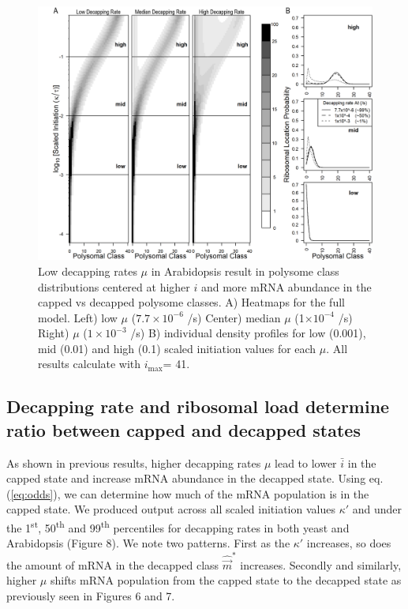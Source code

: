 \documentclass[a4,center,fleqn,nocrop]{NAR}
\newcommand{\imax}{\ensuremath{{i_{\max}}}\xspace}
\newcommand{\mvec}{\ensuremath{\vec{m}}\xspace}
\newcommand{\mvechat}{\ensuremath{\hat{\mvec}}\xspace}
\newcommand{\mvechatstar}{\ensuremath{\mvechat^*}\xspace}
\newcommand{\MRL}{\ensuremath{\bar{i}}\xspace}
\begin{document}
\begin{figure}[!ht]
\begin{center}
\centering
\includegraphics[width=140mm]{Images/2023-07-09_Figure2_At_Marking_Rate_range_medianlength_with_labels.png}
\caption{Low decapping rates $\mu$ in Arabidopsis result in polysome class distributions centered at higher $i$ and more mRNA abundance in the capped vs decapped polysome classes.  A)  Heatmaps for the full model. Left) low $\mu$ ($7.7\times 10^{-6}$ /s) Center) median $\mu$ (1$\times 10^{-4}$ /s) Right) $\mu$ ($1\times 10^{-3}$ /s) B) individual density profiles for low (0.001), mid (0.01) and high (0.1) scaled initiation values for each $\mu$. All results calculate with \imax = 41.}
\end{center}
\end{figure}



\subsection{Decapping rate and ribosomal load determine ratio between capped and decapped states}
 As shown in previous results, higher decapping rates $\mu$ lead to lower \MRL in the capped state and increase mRNA abundance in the decapped state.
Using eq. (\ref{eq:odds}), we can determine how much of the mRNA population is in the capped state.
We produced output across all scaled initiation values $\kappa'$ and under the 1\textsuperscript{st}, 50\textsuperscript{th} and 99\textsuperscript{th} percentiles for decapping rates in both yeast and Arabidopsis (Figure 8). 
We note two patterns. First as the $\kappa'$ increases, so does the amount of mRNA in the decapped class  \mvechatstar increases. 
Secondly and similarly, higher $\mu$ shifts mRNA population from the capped state to the decapped state as previously seen in Figures 6 and 7.  
\end{document}
